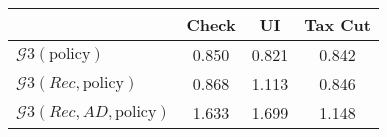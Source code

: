 \begin{tabular}{@{}lccc@{}} 
\toprule 
                          & Check      & UI    & Tax Cut    \\  \midrule 
$\mathcal{G}3(\text{policy})$ & 0.850  & 0.821  & 0.842     \\ 
$\mathcal{G}3(Rec,\text{policy})$ & 0.868  & 1.113  & 0.846     \\ 
$\mathcal{G}3(Rec, AD,\text{policy})$ & 1.633  & 1.699  & 1.148     \\ 
\end{tabular}  
